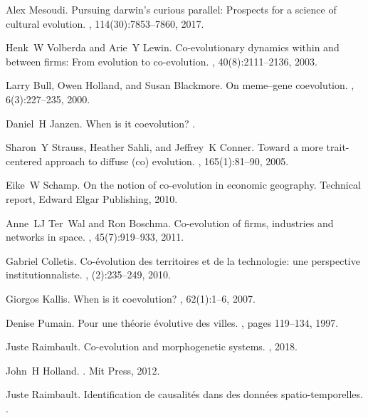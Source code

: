 \documentclass[11pt]{article}
\begin{document}
\begin{thebibliography}{10}
Alex Mesoudi.
\newblock Pursuing darwin’s curious parallel: Prospects for a science of
  cultural evolution.
,
  114(30):7853--7860, 2017.

Henk~W Volberda and Arie~Y Lewin.
\newblock Co-evolutionary dynamics within and between firms: From evolution to
  co-evolution.
, 40(8):2111--2136, 2003.

Larry Bull, Owen Holland, and Susan Blackmore.
\newblock On meme--gene coevolution.
, 6(3):227--235, 2000.

Daniel~H Janzen.
\newblock When is it coevolution?
.

Sharon~Y Strauss, Heather Sahli, and Jeffrey~K Conner.
\newblock Toward a more trait-centered approach to diffuse (co) evolution.
, 165(1):81--90, 2005.

Eike~W Schamp.
\newblock On the notion of co-evolution in economic geography.
\newblock Technical report, Edward Elgar Publishing, 2010.

Anne~LJ Ter~Wal and Ron Boschma.
\newblock Co-evolution of firms, industries and networks in space.
, 45(7):919--933, 2011.

Gabriel Colletis.
\newblock Co-{\'e}volution des territoires et de la technologie: une
  perspective institutionnaliste.
, (2):235--249, 2010.

Giorgos Kallis.
\newblock When is it coevolution?
, 62(1):1--6, 2007.

Denise Pumain.
\newblock Pour une th{\'e}orie {\'e}volutive des villes.
, pages 119--134, 1997.

Juste Raimbault.
\newblock Co-evolution and morphogenetic systems.
, 2018.

John~H Holland.
.
\newblock Mit Press, 2012.

Juste Raimbault.
\newblock Identification de causalit{\'e}s dans des donn{\'e}es
  spatio-temporelles.
.


\end{thebibliography}
\end{document}
